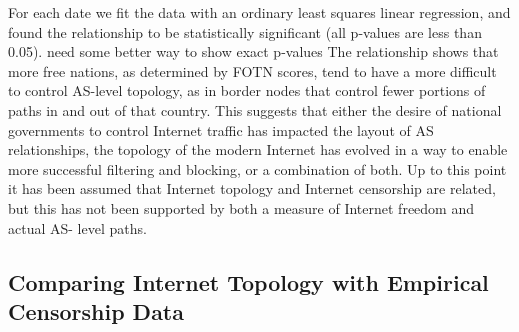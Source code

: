 \documentclass{article}
\begin{document}
\begin{multicols}{2}
\par For each date we fit the data with an ordinary least
squares linear regression, and found the relationship to be statistically
significant (all p-values are less than 0.05). {\color{blue}need some better way to show
exact p-values} The relationship shows that more free nations, as determined
by FOTN scores, tend to have a more difficult to control AS-level topology, as
in border nodes that control fewer portions of paths in and out of that
country. This suggests that either the desire of national governments to
control Internet traffic has impacted the layout of AS relationships, the
topology of the modern Internet has evolved in a way to enable more successful
filtering and blocking, or a combination of both. Up to this point it has been
assumed that Internet topology and Internet censorship are related, but this
has not been supported by both a measure of Internet freedom and actual AS-
level paths.

\subsection{Comparing Internet Topology with Empirical Censorship Data}


\end{multicols}
\end{document}
